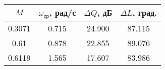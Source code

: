 \begin{tabular}{|c|c|c|c|}
\hline
   $M$ &  $\omega_{ср}$, рад/с &  $\Delta Q$, дБ &  $\Delta L$, град. \\
\hline
0.3071 &                 0.715 &          24.900 &             87.115 \\
  0.61 &                 0.878 &          22.855 &             89.076 \\
0.6119 &                 1.565 &          17.607 &             83.986 \\
\hline
\end{tabular}
